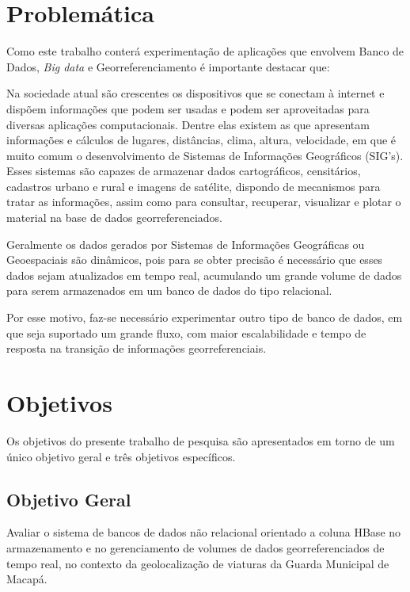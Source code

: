\section{Problemática}

Como este trabalho conterá experimentação de aplicações que envolvem Banco de Dados, \textit{Big data} e Georreferenciamento é importante destacar que:

Na sociedade atual são crescentes os dispositivos que se conectam à internet e dispõem informações que podem ser usadas e podem ser aproveitadas para diversas aplicações computacionais\cite{Vega}. Dentre elas existem as que apresentam informações e cálculos de lugares, distâncias, clima, altura, velocidade, em que é muito comum o desenvolvimento de Sistemas de Informações Geográficos (SIG’s)\cite{Vega}. Esses sistemas são capazes de armazenar dados cartográficos, censitários, cadastros urbano e rural e imagens de satélite, dispondo de mecanismos para tratar as informações, assim como para consultar, recuperar, visualizar e plotar o material na base de dados georreferenciados\cite{Vega}.

Geralmente os dados gerados por Sistemas de Informações Geográficas ou Geoespaciais são dinâmicos, pois para se obter precisão é necessário que esses dados sejam atualizados em tempo real, acumulando um grande volume de dados para serem armazenados em um banco de dados do tipo relacional\cite{Prikh}.

Por esse motivo, faz-se necessário experimentar outro tipo de banco de dados, em que seja suportado um grande fluxo, com maior escalabilidade e tempo de resposta na transição de informações georreferenciais.

\section{Objetivos}
Os objetivos do presente trabalho de pesquisa são apresentados em torno de um único objetivo geral e três objetivos específicos.

\subsection{Objetivo Geral}

Avaliar o sistema de bancos de dados não relacional orientado a coluna HBase no armazenamento e no gerenciamento de volumes de dados georreferenciados de tempo real, no contexto da geolocalização de viaturas da Guarda Municipal de Macapá.

